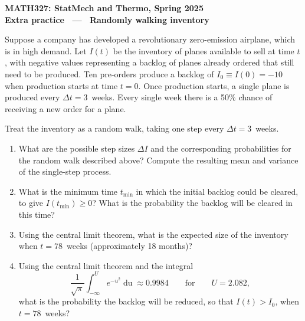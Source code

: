 \documentclass[12 pt]{article} %
\newcommand{\De}{\ensuremath{\Delta} }
\renewcommand{\d}[1]{\ensuremath{\mathop{d#1}} }
\begin{document}
\newcommand{\thisunit}{MATH327 Extra (Inventory)}
\newcommand{\moddate}{Last modified 27 Feb.~2025}
\begin{center}
  {\Large \textbf{MATH327: StatMech and Thermo, Spring 2025}} \\[12 pt]
  {\Large \textbf{Extra practice \ --- \ Randomly walking inventory}} \\[24 pt]
\end{center}

Suppose a company has developed a revolutionary zero-emission airplane, which is in high demand.
Let $I(t)$ be the inventory of planes available to sell at time $t$, with negative values representing a backlog of planes already ordered that still need to be produced.
Ten pre-orders produce a backlog of $I_0 \equiv I(0) = -10$ when production starts at time $t = 0$.
Once production starts, a single plane is produced every $\De t = 3$~weeks.
Every single week there is a 50\% chance of receiving a new order for a plane.

Treat the inventory as a random walk, taking one step every $\De t = 3$~weeks. \\[-30 pt]

\begin{enumerate}[label={(\alph*)}]
  \item What are the possible step sizes $\De I$ and the corresponding probabilities for the random walk described above? %
        Compute the resulting mean and variance of the single-step process.

  \item What is the minimum time $t_{\text{min}}$ in which the initial backlog could be cleared, to give $I(t_{\text{min}}) \geq 0$?
        What is the probability the backlog will be cleared in this time?

  \item Using the central limit theorem, what is the expected size of the inventory when $t = 78$~weeks (approximately 18 months)?

  \item Using the central limit theorem and the integral
        \begin{equation*}
          \frac{1}{\sqrt{\pi}} \int_{-\infty}^U e^{-u^2} \d{u} \approx 0.9984  \qquad \mbox{for} \qquad U = 2.082,
        \end{equation*}
        what is the probability the backlog will be reduced, so that $I(t) > I_0$, when $t = 78$~weeks?
\end{enumerate}
\end{document}
